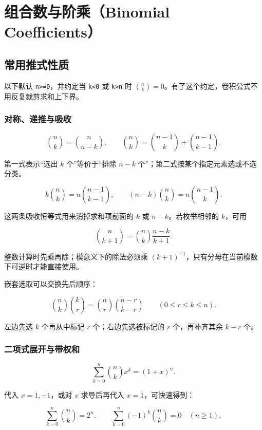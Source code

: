 \section{组合数与阶乘（Binomial Coefficients）}\label{ux7ec4ux5408ux6570ux4e0eux9636ux4e58}

\subsection{常用推式性质}\label{large-math-binomial-identities}

以下默认 \passthrough{\lstinline!n>=0!}，并约定当 \passthrough{\lstinline!k<0!} 或 \passthrough{\lstinline!k>n!} 时
\(\binom{n}{k}=0\)。有了这个约定，卷积公式不用反复裁剪求和上下界。

\subsubsection{对称、递推与吸收}

\[
\binom{n}{k}=\binom{n}{n-k},\qquad
\binom{n}{k}=\binom{n-1}{k}+\binom{n-1}{k-1}.
\]

第一式表示“选出 \(k\) 个”等价于“排除 \(n-k\) 个”；第二式按某个指定元素选或不选分类。

\[
k\binom{n}{k}=n\binom{n-1}{k-1},\qquad
(n-k)\binom{n}{k}=n\binom{n-1}{k}.
\]

这两条吸收恒等式用来消掉求和项前面的 \(k\) 或 \(n-k\)。若枚举相邻的 \(k\)，可用

\[
\binom{n}{k+1}=\binom{n}{k}\frac{n-k}{k+1}.
\]

整数计算时先乘再除；模意义下的除法必须乘 \((k+1)^{-1}\)，只有分母在当前模数下可逆时才能直接使用。

嵌套选取可以交换先后顺序：

\[
\binom{n}{k}\binom{k}{r}
=\binom{n}{r}\binom{n-r}{k-r}
\qquad(0\le r\le k\le n).
\]

左边先选 \(k\) 个再从中标记 \(r\) 个；右边先选被标记的 \(r\) 个，再补齐其余 \(k-r\) 个。

\subsubsection{二项式展开与带权和}

\[
\sum_{k=0}^{n}\binom{n}{k}x^k=(1+x)^n.
\]

代入 \(x=1,-1\)，或对 \(x\) 求导后再代入 \(x=1\)，可快速得到：

\[
\sum_{k=0}^{n}\binom{n}{k}=2^n,\qquad
\sum_{k=0}^{n}(-1)^k\binom{n}{k}=0\quad(n\ge1),
\]

